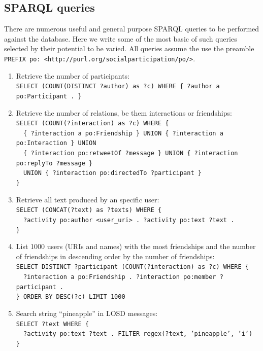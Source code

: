 \documentclass[review]{elsarticle}
\newcommand{\textttt}[1] {\texttt{\footnotesize#1}}
\newcommand{\h} {\hphantom ~ }
\begin{document}
\subsection{SPARQL queries}\label{queries}
There are numerous useful and general purpose SPARQL queries to be performed against the database.
Here we write some of the most basic of such queries selected by their potential to be varied.
All queries assume the use the preamble \textttt{PREFIX po: <http://purl.org/socialparticipation/po/>}.
\begin{enumerate}[leftmargin=0cm]
	\item Retrieve the number of participants:\\
            \textttt{SELECT (COUNT(DISTINCT ?author) as ?c) WHERE \{
            ?author a po:Participant . \} }
	\item Retrieve the number of relations, be them interactions or
            friendships:\\
            \textttt{SELECT (COUNT(?interaction) as ?c) WHERE \{\\
                    \h \{ ?interaction a po:Friendship \} UNION \{ ?interaction
                    a po:Interaction \} UNION\\
                    \h \{ ?interaction po:retweetOf
                    ?message \} UNION \{ ?interaction po:replyTo ?message
                    \}\\
                    \h UNION \{ ?interaction po:directedTo ?participant
                    \}\\ \} }
	\item Retrieve all text produced by an specific user:\\
            \textttt{SELECT (CONCAT(?text) as ?texts) WHERE \{\\
                    \h ?activity po:author <user\_uri> . ?activity po:text ?text .\\
    \}}
        \item List 1000 users (URIs and names) with the most friendships and the number of
            friendships in descending order by the number of friendships:\\
            \textttt{SELECT DISTINCT ?participant (COUNT(?interaction)
            as ?c) WHERE \{\\
                \h ?interaction a po:Friendship . ?interaction po:member ?participant . \\
            \} ORDER BY DESC(?c) LIMIT 1000}
	\item Search string ``pineapple'' in LOSD messages:\\
            \textttt{SELECT ?text WHERE \{ \\
                    \h ?activity po:text ?text . FILTER regex(?text, 'pineapple', 'i')\\
    \}}
\end{enumerate}
\end{document}
